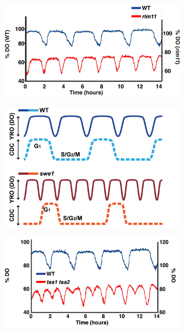 \begin{figure}
\begin{subfigure}[htpb]{0.4\textwidth}
  \end{subfigure}
  \begin{subfigure}[htpb]{0.4\textwidth}
   \centering
   \includegraphics[width=\textwidth]{caustonMetabolicCyclesYeast2015_2e_adapted}
   \caption{
   }
   \label{fig:intro-ymc-rim11}
  \end{subfigure}
  \begin{subfigure}[htpb]{0.4\textwidth}
   \centering
   \includegraphics[width=\textwidth]{caustonMetabolicCyclesYeast2015_1e_adapted}
   \caption{
   }
   \label{fig:intro-ymc-swe1}
  \end{subfigure}
  \begin{subfigure}[htpb]{0.4\textwidth}
   \centering
   \includegraphics[width=\textwidth]{caustonMetabolicCyclesYeast2015_4a_adapted}

\end{subfigure}
\end{figure}
